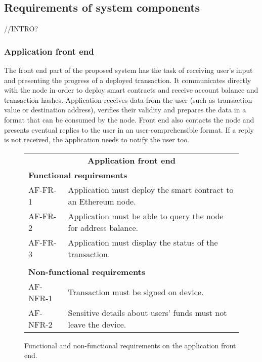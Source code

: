 \subsection{Requirements of system components}

//INTRO?

\subsubsection{Application front end}\label{sec:app-front-reqs}
The front end part of the proposed system has the task of receiving user's input and presenting the progress of a deployed transaction. It communicates directly with the node in order to deploy smart contracts and receive account balance and transaction hashes. Application receives data from the user (such as transaction value or destination address), verifies their validity and prepares the data in a format that can be consumed by the node. Front end also contacts the node and presents eventual replies to the user in an user-comprehensible format. If a reply is not received, the application needs to notify the user too.

\begin{figure}[ht]
    \begin{tabularx}{\textwidth}{|l X|}
    \hline
        \multicolumn{2}{|c|}{\textbf{Application front end}}\\
        \multicolumn{2}{|l|}{\textbf{Functional requirements}}\\
        AF-FR-1&Application must deploy the smart contract to an Ethereum node.\\
        AF-FR-2&Application must be able to query the node for address balance.\\
        AF-FR-3&Application must display the status of the transaction.\\
        &\\
        \multicolumn{2}{|l|}{\textbf{Non-functional requirements}}\\
        AF-NFR-1&Transaction must be signed on device.\\
        AF-NFR-2&Sensitive details about users' funds must not leave the device.\\
    \hline
    \end{tabularx}
   
    \caption{Functional and non-functional requirements on the application front end.}
    \label{fig:reqa-applicaion}
\end{figure}

